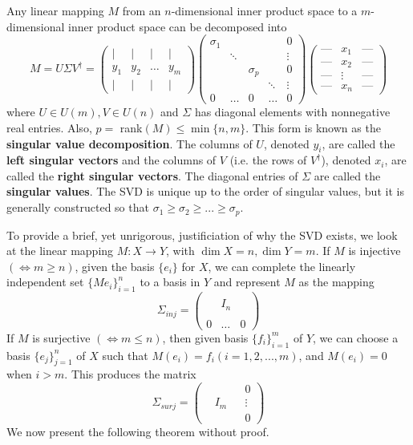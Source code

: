   \begin{theorem}
  Any linear mapping $M$ from an $n$-dimensional inner product space to a $m$-dimensional inner product space can be decomposed into 
  \[ M = U \Sigma V^\dagger = \begin{pmatrix}
   \vert & \vert & \vert & \vert\\
  y_1 & y_2 & \ldots & y_m \\
  \vert & \vert & \vert & \vert
  \end{pmatrix}\begin{pmatrix}
  \sigma_1 & & & &0\\
  &\ddots &&& \vdots \\
  & & \sigma_p & & 0\\
  & & & \ddots &\vdots \\
  0 & \ldots &0& \ldots &0
  \end{pmatrix} \begin{pmatrix}
  \text{---}&x_1&\text{---} \\
  \text{---}&x_2&\text{---} \\
  \text{---}&\vdots&\text{---} \\
  \text{---}&x_n&\text{---}
  \end{pmatrix} \]
  where $U \in U(m), V \in U(n)$ and $\Sigma$ has diagonal elements with nonnegative real entries. Also, $p = $ rank$(M) \leq \min{\{n,m\}}$. This form is known as the \textbf{singular value decomposition}. The columns of $U$, denoted $y_i$, are called the \textbf{left singular vectors} and the columns of $V$ (i.e. the rows of $V^\dagger$), denoted $x_i$, are called the \textbf{right singular vectors}. The diagonal entries of $\Sigma$ are called the \textbf{singular values}. The SVD is unique up to the order of singular values, but it is generally constructed so that $\sigma_1 \geq \sigma_2 \geq ... \geq \sigma_p$. 
  \end{theorem}

  To provide a brief, yet unrigorous, justificiation of why the SVD exists, we look at the linear mapping $M: X \longrightarrow Y$, with $\dim{X} = n, \dim{Y} = m$. If $M$ is injective $(\iff m \geq n)$, given the basis $\{e_i\}$ for $X$, we can complete the linearly independent set $\{Me_i\}_{i=1}^n$ to a basis in $Y$ and represent $M$ as the mapping
  \[\Sigma_{inj} = \begin{pmatrix}
  &&\\
  &I_n&\\
  &&\\
  0&\ldots &0
  \end{pmatrix}\]
  If $M$ is surjective $(\iff m \leq n)$, then given basis $\{f_i\}_{i=1}^m$ of $Y$, we can choose a basis $\{e_j\}_{j=1}^n$ of $X$ such that $M(e_i) = f_i (i = 1, 2, ..., m)$, and $M(e_i) = 0$ when $i > m$. This produces the matrix
  \[\Sigma_{surj} = \begin{pmatrix}
  &&&0\\&I_m&& \vdots \\&&&0\end{pmatrix}\]
  We now present the following theorem without proof. 

